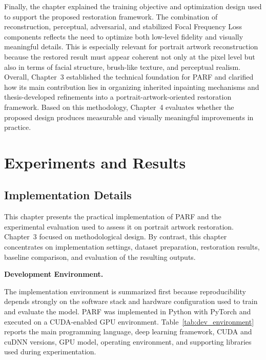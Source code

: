 \documentclass[12pt, twoside]{report}
\begin{document}
Finally, the chapter explained the training objective and optimization design used to support the proposed restoration framework. The combination of reconstruction, perceptual, adversarial, and stabilized Focal Frequency Loss components reflects the need to optimize both low-level fidelity and visually meaningful details. This is especially relevant for portrait artwork reconstruction because the restored result must appear coherent not only at the pixel level but also in terms of facial structure, brush-like texture, and perceptual realism. Overall, Chapter~3 established the technical foundation for PARF and clarified how its main contribution lies in organizing inherited inpainting mechanisms and thesis-developed refinements into a portrait-artwork-oriented restoration framework. Based on this methodology, Chapter~4 evaluates whether the proposed design produces measurable and visually meaningful improvements in practice.

\chapter{Experiments and Results}

\section{Implementation Details}

This chapter presents the practical implementation of PARF and the experimental evaluation used to assess it on portrait artwork restoration. Chapter~3 focused on methodological design. By contrast, this chapter concentrates on implementation settings, dataset preparation, restoration results, baseline comparison, and evaluation of the resulting outputs.

\vspace{0.35\baselineskip}
\noindent\textbf{Development Environment.}\par

The implementation environment is summarized first because reproducibility depends strongly on the software stack and hardware configuration used to train and evaluate the model. PARF was implemented in Python with PyTorch and executed on a CUDA-enabled GPU environment. Table~\ref{tab:dev_environment} reports the main programming language, deep learning framework, CUDA and cuDNN versions, GPU model, operating environment, and supporting libraries used during experimentation.
\end{document}
